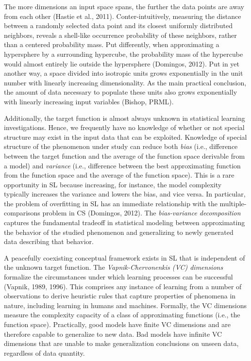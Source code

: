 \documentclass[authoryear,review,3p]{elsarticle}
\begin{document}
The more dimensions an input space spans,
the further the data points are away from each other
(Hastie et al., 2011).
Conter-intuitively,
measuring the distance between a randomly selected data point
and its closest uniformly distributed neighbors,
reveals a shell-like occurrence probability of
these neighbors, rather than a centered probability mass.
%
Put differently,
when approximating a hypersphere by a surrounding hypercube,
the probability mass of the hypercube
would almost entirely lie outside the hypersphere
(Domingos, 2012).
%
Put in yet another way,
a space divided into isotropic units grows exponentially in the
unit number with linearly increasing dimensionality.
As the main practical conclusion,
the amount of data necessary to populate these units
also grows exponentially
with linearly increasing input variables
(Bishop, PRML).



Additionally,
the target function is almost always unknown
in statistical learning investigations.
Hence, we frequently have no knowledge of whether or not
special structure may exist in the input data that can be exploited.
%
Knowledge of special structure of the phenomenon under study
can reduce both \textit{bias}
(i.e., difference between the target function and
the average of the function space derivable from a model)
and
\textit{variance}
(i.e., difference between the best approximating function 
from the function space and
the average of the function space).
This is a rare opportunity in SL because increasing,
for instance, the model complexity
typically increases the variance and lowers the bias, and vice versa.
%
In particular,
the problem of overfitting in SL has an immediate relationship
with the multiple-comparisons problem in CS
(Domingos, 2012).
%
The \textit{bias-variance decomposition} captures the fundamental
tradeoff in statistical modeling between
approximating the behavior of
the studied phenomenon and
generalizing to newly generated data describing that behavior. 



A peacefully coexisting conceptual framework exists in SL
that is independent
of the unknown target function.
The \textit{Vapnik-Chervonenkis (VC) dimensions}
formalize the circumstances
under which learning processes can be successful (Vapnik, 1989, 1996).
This comprises any instance of learning
from a number of observations
to derive heuristic rules that capture properties of phenomena in nature,
including learning in humans and machines.
Formally, the VC dimensions measure the
complexity capacity of a class of approximating functions
(i.e., the function space). 
%
Practically, good models have finite VC dimensions
and are therefore capable to generalize to new data.
Bad models have infinite VC dimensions that
are unable to make generalization conclusions on unseen data,
regardless of data quantity.
\end{document}
